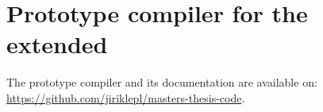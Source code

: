 \chapter{Prototype compiler for the extended \cmm}
\label{chap:proto}

The prototype compiler and its documentation are available on: \url{https://github.com/jiriklepl/masters-thesis-code}.
